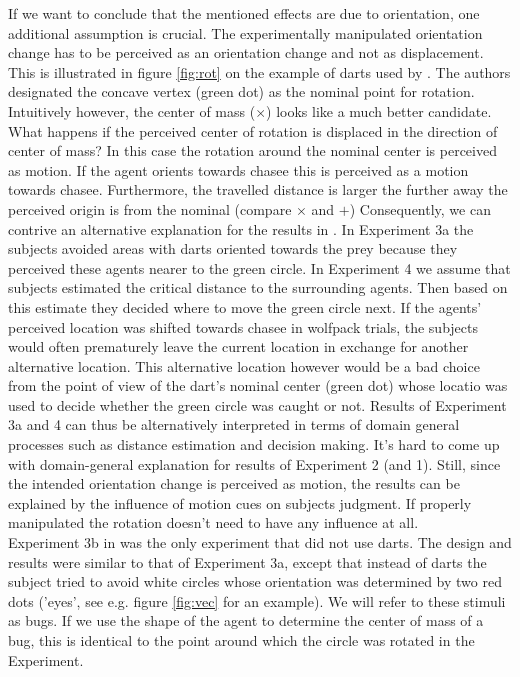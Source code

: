 \documentclass[10pt]{article}
\begin{document}
If we want to conclude that the mentioned effects are due to orientation, one additional assumption is crucial. 
The experimentally manipulated orientation change has to be perceived as an orientation change and not as displacement. 
This is illustrated in figure \ref{fig:rot} on the example of darts used by \cite{gao10}. 
The authors designated the concave vertex (green dot) as the nominal point for rotation. 
Intuitively however, the center of mass ($\times$) looks like a much better candidate. 
What happens if the perceived center of rotation is displaced in the direction of center of mass?
In this case the rotation around the nominal center is perceived as motion. 
If the agent orients towards chasee this is perceived as a motion towards chasee.
Furthermore, the travelled distance is larger the further away the perceived origin is from the nominal (compare $\times$ and $+$) 
Consequently, we can contrive an alternative explanation for the results in \cite{gao10}. 
In Experiment 3a the subjects avoided areas with darts oriented towards the prey because they perceived these agents nearer to the green circle. 
In Experiment 4 we assume that subjects estimated the critical distance to the surrounding agents. 
Then based on this estimate they decided where to move the green circle next. 
If the agents' perceived location was shifted towards chasee in wolfpack trials, the subjects would often prematurely leave the current location in exchange for another alternative location. 
This alternative location however would be a bad choice from the point of view of the dart's nominal center (green dot) whose locatio was used to decide whether the green circle was caught or not. 
Results of Experiment 3a and 4 can thus be alternatively interpreted in terms of domain general processes such as distance estimation and decision making. 
It's hard to come up with domain-general explanation for results of Experiment 2 (and 1). 
Still, since the intended orientation change is perceived as motion, the results can be explained by the influence of motion cues on subjects judgment. 
If properly manipulated the rotation doesn't need to have any influence at all.\\
Experiment 3b in \cite{gao10} was the only experiment that did not use darts. 
The design and results were similar to that of Experiment 3a, except that instead of darts the subject tried to avoid white circles whose orientation was determined by two red dots ('eyes', see e.g. figure \ref{fig:vec} for an example).
We will refer to these stimuli as bugs. 
If we use the shape of the agent to determine the center of mass of a bug, this is identical to the point around which the circle was rotated in the Experiment. 
\end{document}
